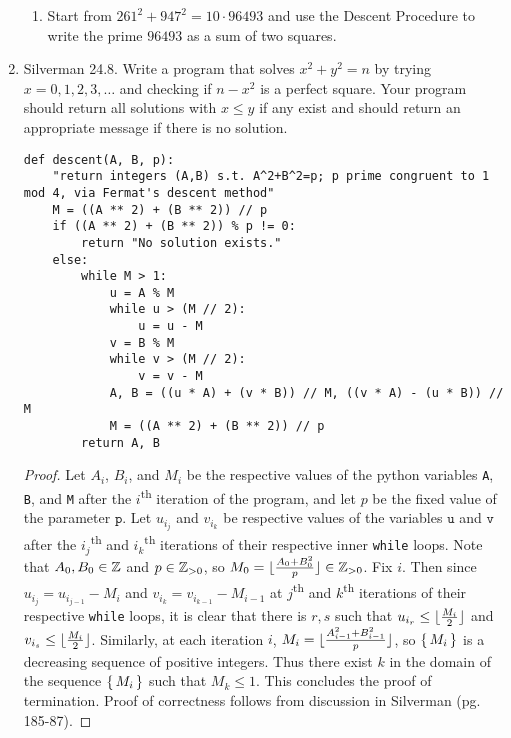 \documentclass[10pt]{article}
\begin{document}
\begin{enumerate}[itemsep=1em,label=\Alph*.,leftmargin=*]
\begin{enumerate}[label=(\alph*),leftmargin=*]
            \item Start from $261^2+947^2=10 \cdot 96493$ and use the Descent Procedure to write the prime $96493$ as a sum of two squares.

        
        \end{enumerate}
 
\pagebreak
    \item Silverman 24.8. Write a program that solves $x^2+y^2=n$ by trying $x=0,1,2,3,\ldots$ and checking if $n-x^2$ is a perfect square. Your program should return all solutions with $x \leq y$ if any exist and should return an appropriate message if there is no solution.

        \begin{lstlisting}
def descent(A, B, p):
    "return integers (A,B) s.t. A^2+B^2=p; p prime congruent to 1 mod 4, via Fermat's descent method"
    M = ((A ** 2) + (B ** 2)) // p
    if ((A ** 2) + (B ** 2)) % p != 0:
        return "No solution exists."
    else:
        while M > 1:
            u = A % M
            while u > (M // 2):
                u = u - M
            v = B % M
            while v > (M // 2):
                v = v - M
            A, B = ((u * A) + (v * B)) // M, ((v * A) - (u * B)) // M
            M = ((A ** 2) + (B ** 2)) // p
        return A, B
        \end{lstlisting}
\begin{proof}
    Let $A_i$, $B_i$, and $M_i$ be the respective values of the python variables \texttt{A}, \texttt{B}, and \texttt{M} after the $i$\textsuperscript{th} iteration of the program, and let $p$ be the fixed value of the parameter $\texttt{p}$. Let $u_{i_j}$ and $v_{i_k}$ be respective values of the variables $\texttt{u}$ and $\texttt{v}$ after the $i_j$\textsuperscript{th} and $i_k$\textsuperscript{th} iterations of their respective inner \texttt{while} loops. Note that $A_0,B_0 \in \mathbb{Z}$ and $p\in \mathbb{Z}_{>0}$, so $M_0=\lfloor\frac{A_0+B_0^2}{p}\rfloor \in \mathbb{Z}_{>0}$. Fix $i$. Then since $u_{i_j}=u_{i_{j-1}}-M_i$ and $v_{i_k}=v_{i_{k-1}}-M_{i-1}$ at $j$\textsuperscript{th} and $k$\textsuperscript{th} iterations of their respective \texttt{while} loops, it is clear that there is $r,s$ such that $u_{i_r}\leq \lfloor\frac{M_i}{2}\rfloor$ and $v_{i_s}  \leq \lfloor\frac{M_i}{2}\rfloor$. Similarly, at each iteration $i$, $M_i=\lfloor\frac{A_{i-1}^2+B_{i-1}^2}{p}\rfloor$, so $\set{M_i}$ is a decreasing sequence of positive integers. Thus there exist $k$ in the domain of the sequence $\set{M_i}$ such that $M_k \leq 1$. This concludes the proof of termination. Proof of correctness follows from discussion in Silverman (pg. 185-87). 
\end{proof}



\end{enumerate}
\end{document}
